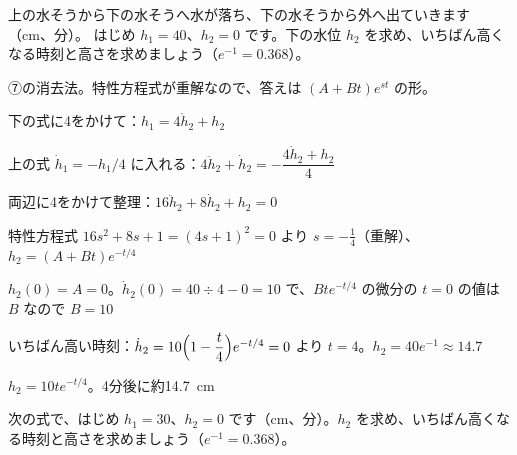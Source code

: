 \begin{reidai}
上の水そうから下の水そうへ水が落ち、下の水そうから外へ出ていきます（cm、分）。
はじめ $h_1=40$、$h_2=0$ です。下の水位 $h_2$ を求め、いちばん高くなる時刻と高さを求めましょう（$e^{-1}=0.368$）。\par
\kangaekata ⑦の消去法。特性方程式が重解なので、答えは $(A+Bt)e^{st}$ の形。\par
\shiki\kvios{}\zw{} 下の式に4をかけて：$h_1=4\dot h_2+h_2$\par
\kvioa 上の式 $\dot h_1=-h_1/4$ に入れる：$4\ddot h_2+\dot h_2=-\dfrac{4\dot h_2+h_2}{4}$\par
\kviob 両辺に4をかけて整理：$16\ddot h_2+8\dot h_2+h_2=0$\par
\kvioa 特性方程式 $16s^2+8s+1=(4s+1)^2=0$ より $s=-\tfrac14$（重解）、$h_2=(A+Bt)e^{-t/4}$\par
\kvioa $h_2(0)=A=0$。$\dot h_2(0)=40\div4-0=10$ で、$Bte^{-t/4}$ の微分の $t=0$ の値は $B$ なので $B=10$\par
\kvioa いちばん高い時刻：$\dot h_2=10\Bigl(1-\dfrac{t}{4}\Bigr)e^{-t/4}=0$ より $t=4$。$h_2=40e^{-1}\approx14.7$\par
\kotae\kvios{}\zw{} $h_2=10te^{-t/4}$。4分後に約\qty{14.7}{cm}
\end{reidai}

\begin{jibun}
次の式で、はじめ $h_1=30$、$h_2=0$ です（cm、分）。$h_2$ を求め、いちばん高くなる時刻と高さを求めましょう（$e^{-1}=0.368$）。
\end{jibun}

